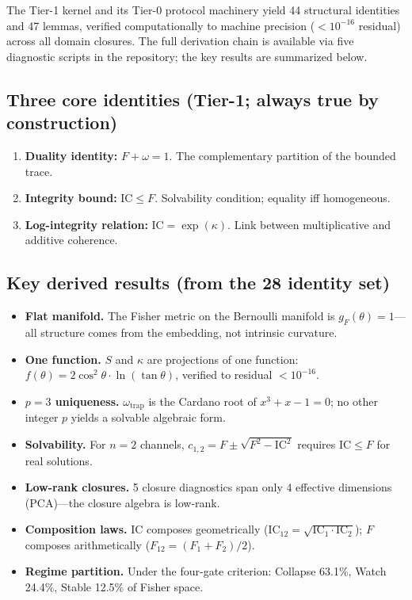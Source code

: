 \documentclass[
  aps,
  prd,
  preprint,
  superscriptaddress,
  nofootinbib,
  floatfix
]{revtex4-2}
\newcommand{\IC}{\mathrm{IC}}
\begin{document}
The Tier-1 kernel and its Tier-0 protocol machinery yield 44 structural identities and 47 lemmas,
verified computationally to machine precision ($<10^{-16}$ residual) across all domain closures.
The full derivation chain is available via five diagnostic scripts in the repository;
the key results are summarized below.

\subsection{Three core identities (Tier-1; always true by construction)}
\begin{enumerate}[leftmargin=2.2em]
  \item \textbf{Duality identity:} $F+\omega=1$. The complementary partition of the bounded trace.
  \item \textbf{Integrity bound:} $\IC \le F$. Solvability condition; equality iff homogeneous.
  \item \textbf{Log-integrity relation:} $\IC = \exp(\kappa)$. Link between multiplicative and additive coherence.
\end{enumerate}

\subsection{Key derived results (from the 28 identity set)}
\begin{itemize}[leftmargin=1.6em]
  \item \textbf{Flat manifold.} The Fisher metric on the Bernoulli manifold is $g_F(\theta)=1$---all structure comes from
  the embedding, not intrinsic curvature.
  \item \textbf{One function.} $S$ and $\kappa$ are projections of one function: $f(\theta)=2\cos^2\theta\cdot\ln(\tan\theta)$,
  verified to residual $<10^{-16}$.
  \item \textbf{$p=3$ uniqueness.} $\omega_{\mathrm{trap}}$ is the Cardano root of $x^3+x-1=0$; no other integer $p$ yields
  a solvable algebraic form.
  \item \textbf{Solvability.} For $n=2$ channels, $c_{1,2}=F\pm\sqrt{F^2-\IC^2}$ requires $\IC\le F$ for real solutions.
  \item \textbf{Low-rank closures.} 5 closure diagnostics span only 4 effective dimensions (PCA)---the closure algebra is low-rank.
  \item \textbf{Composition laws.} $\IC$ composes geometrically ($\IC_{12}=\sqrt{\IC_1\cdot\IC_2}$); $F$ composes
  arithmetically ($F_{12}=(F_1+F_2)/2$).
  \item \textbf{Regime partition.} Under the four-gate criterion: Collapse 63.1\%, Watch 24.4\%, Stable 12.5\% of Fisher space.
\end{itemize}
\end{document}
